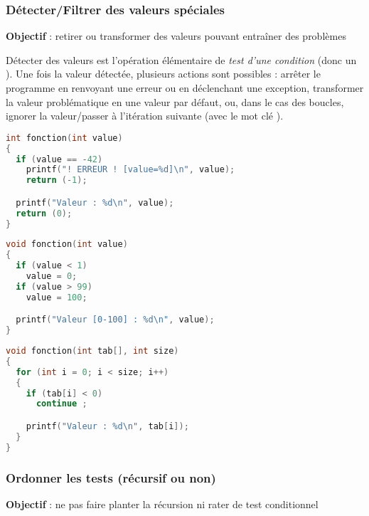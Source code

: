 \documentclass[11pt,a4paper]{article}
\begin{document}
\medskip

\subsubsection{Détecter/Filtrer des valeurs spéciales}

\textbf{Objectif} : retirer ou transformer des valeurs pouvant entraîner des problèmes

\bigskip

Détecter des valeurs est l'opération élémentaire de \textit{test d'une condition} (donc un ).
Une fois la valeur détectée, plusieurs actions sont possibles : arrêter le programme en renvoyant une erreur ou en déclenchant une exception, transformer la valeur problématique en une valeur par défaut, ou, dans le cas des boucles, ignorer la valeur/passer à l'itération suivante (avec le mot clé ).

\bigskip

\begin{lstlisting}[language=C]
int fonction(int value)
{
  if (value == -42)
    printf("! ERREUR ! [value=%d]\n", value);
    return (-1);

  printf("Valeur : %d\n", value);
  return (0);
} \end{lstlisting}

\vfillFirst

\begin{lstlisting}[language=C]
void fonction(int value)
{
  if (value < 1)
    value = 0;
  if (value > 99)
    value = 100;

  printf("Valeur [0-100] : %d\n", value);
} \end{lstlisting}

\vfillLast

\begin{lstlisting}[language=C]
void fonction(int tab[], int size)
{
  for (int i = 0; i < size; i++)
  {
    if (tab[i] < 0)
      continue ;

    printf("Valeur : %d\n", tab[i]);
  }
} \end{lstlisting}


\clearpage

\subsubsection{Ordonner les tests (récursif ou non)}

\textbf{Objectif} : ne pas faire planter la récursion ni rater de test conditionnel
\end{document}
